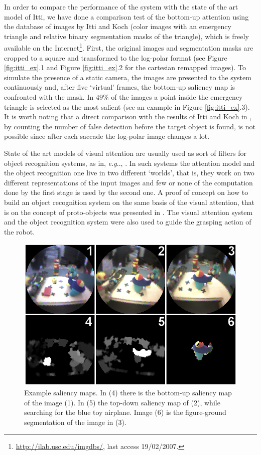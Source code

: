 \documentclass{llncs}
\makeatletter
\DeclareRobustCommand\onedot{\futurelet\@let@token\@onedot}
\def\@onedot{\ifx\@let@token.\else.\null\fi\xspace}
\def\eg{\emph{e.g}\onedot} \def\Eg{\emph{E.g}\onedot}
\makeatother
\begin{document}
In order to compare the performance of the system
with the state of the art model of Itti, we
have done a comparison test of the bottom-up attention
using the database of images by Itti and Koch \cite{IttiK01b} (color
images with an emergency triangle and relative binary
segmentation masks of the triangle), which is freely
available on the Internet\footnote{\url{http://ilab.usc.edu/imgdbs/}, last access 19/02/2007.}.
First, the original images and segmentation masks are
cropped to a square and transformed to the log-polar
format (see Figure \ref{fig:itti_ex}.1 and Figure \ref{fig:itti_ex}.2
for the cartesian remapped images). To simulate the
presence of a static camera, the images are presented to
the system continuously and, after five `virtual'
frames, the bottom-up saliency map is confronted with
the mask. In $49\%$ of the images a point inside the
emergency triangle is selected as the most salient
(see an example in Figure \ref{fig:itti_ex}.3). It is worth noting that a
direct comparison with the results of Itti and Koch in \cite{IttiK01b}, by
counting the number of false detection before the
target object is found, is not possible since after each
saccade the log-polar image changes a lot.

State of the art models of visual attention are usually used as
sort of filters for object recognition systems, as in, \eg, \cite{WaltherK06}.
In such systems the attention model and the object recognition one
live in two different `worlds', that is, they work on two
different representations of the input images and few or none
of the computation done by the first stage is used by the
second one. A proof of concept on how to build an object
recognition system on the same basis of the visual attention,
that is on the concept of proto-objects was presented in
\cite{Orabona07}. The visual attention system and the object recognition
system were also used to guide the grasping action of the robot.


\begin{figure}[]
  \begin{center}
    \includegraphics[width=0.9\linewidth]{./figs/attention/a3}
  \end{center}
  \caption{Example saliency maps. In (4) there is the 
   bottom-up saliency map of the image (1). In (5) the top-down
	 saliency map of (2), while searching for the blue
	 toy airplane. Image (6) is the figure-ground
	 segmentation of the image in (3).}
  \label{fig:out_ex}
\end{figure}
\end{document}
